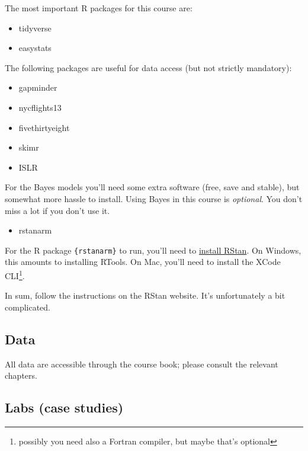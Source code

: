 \documentclass[
  letterpaper,
  DIV=11,
  numbers=noendperiod]{scrreprt}
\providecommand{\tightlist}{%
  \setlength{\itemsep}{0pt}\setlength{\parskip}{0pt}}\usepackage{longtable,booktabs,array}
\theoremstyle{definition}
\theoremstyle{definition}
\theoremstyle{remark}
\begin{document}
The most important R packages for this course are:

\begin{itemize}
\tightlist
\item
  tidyverse
\item
  easystats
\end{itemize}

The following packages are useful for data access (but not strictly
mandatory):

\begin{itemize}
\tightlist
\item
  gapminder
\item
  nycflights13
\item
  fivethirtyeight
\item
  skimr
\item
  ISLR
\end{itemize}

For the Bayes models you'll need some extra software (free, save and
stable), but somewhat more hassle to install. Using Bayes in this course
is \emph{optional}. You don't miss a lot if you don't use it.

\begin{itemize}
\tightlist
\item
  rstanarm
\end{itemize}

For the R package \texttt{\{rstanarm\}} to run, you'll need to
\href{https://github.com/stan-dev/rstan/wiki/RStan-Getting-Started}{install
RStan}. On Windows, this amounts to installing RTools. On Mac, you'll
need to install the XCode CLI\footnote{possibly you need also a Fortran
  compiler, but maybe that's optional}.

In sum, follow the instructions on the RStan website. It's unfortunately
a bit complicated.

\hypertarget{data}{%
\subsection*{Data}\label{data}}

All data are accessible through the course book; please consult the
relevant chapters.

\hypertarget{labs-case-studies}{%
\subsection*{Labs (case studies)}\label{labs-case-studies}}
\end{document}
